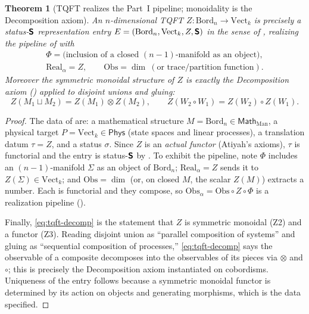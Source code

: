 \documentclass[12pt]{article}
\newtheorem{theorem}{Theorem}[section]
\theoremstyle{definition}
\theoremstyle{remark}
\newcommand{\Bord}{\mathrm{Bord}}
\newcommand{\Vect}{\mathrm{Vect}}
\newcommand{\Man}{\mathrm{Man}}
\newcommand{\Phys}{\mathsf{Phys}}
\newcommand{\Math}{\mathsf{Math}}
\newcommand{\Real}{\mathrm{Real}}
\newcommand{\Obs}{\mathrm{Obs}}
\newcommand{\Sfont}{\textnormal{\sffamily\bfseries S}}
\begin{document}
\begin{theorem}[TQFT realizes the Part~I pipeline; monoidality is the Decomposition axiom]
\label{thm:tqft-entry}
An $n$-dimensional TQFT $Z\colon\Bord_n\to\Vect_k$ is precisely a status-$\Sfont$
representation entry $E=(\Bord_n,\Vect_k,Z,\Sfont)$ in the sense of
, realizing the pipeline of  with
\[
\begin{gathered}
  \Phi=\text{(inclusion of a closed $(n-1)$-manifold as an object)},\\
  \Real_\alpha=Z,\qquad
  \Obs=\dim\ (\text{or trace/partition function}).
\end{gathered}
\]
Moreover the symmetric monoidal structure of $Z$ is exactly the Decomposition
axiom () applied to disjoint unions and gluing:
\begin{equation}
\label{eq:tqft-decomp}
  Z(M_1\sqcup M_2)=Z(M_1)\otimes Z(M_2),\qquad
  Z(W_2\circ W_1)=Z(W_2)\circ Z(W_1).
\end{equation}
\end{theorem}

\begin{proof}
The data of  are: a mathematical structure $M=\Bord_n\in\Math_{\Man}$,
a physical target $P=\Vect_k\in\Phys$ (state spaces and linear processes), a
translation datum $\tau=Z$, and a status $\sigma$. Since $Z$ is an
\emph{actual functor} (Atiyah's axioms), $\tau$ is functorial and the entry is
status-$\Sfont$ by . To exhibit the pipeline, note
$\Phi$ includes an $(n-1)$-manifold $\Sigma$ as an object of $\Bord_n$;
$\Real_\alpha=Z$ sends it to $Z(\Sigma)\in\Vect_k$; and $\Obs=\dim$ (or, on closed
$M$, the scalar $Z(M)$) extracts a number. Each is functorial and they compose,
so $\Obs_\alpha=\Obs\circ Z\circ\Phi$ is a realization pipeline
().

Finally, \eqref{eq:tqft-decomp} is the statement that $Z$ is symmetric monoidal
(Z2) and a functor (Z3). Reading disjoint union as ``parallel composition of
systems'' and gluing as ``sequential composition of processes,'' \eqref{eq:tqft-decomp}
says the observable of a composite decomposes into the observables of its pieces
via $\otimes$ and $\circ$; this is precisely the Decomposition axiom instantiated
on cobordisms. Uniqueness of the entry follows because a symmetric monoidal
functor is determined by its action on objects and generating morphisms, which is
the data specified.
\end{proof}
\end{document}
